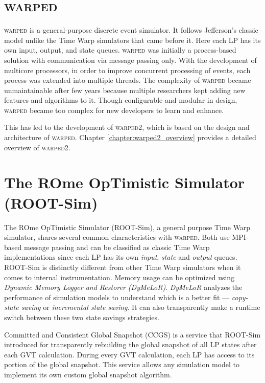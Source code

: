 \documentclass[11pt]{book}
\begin{document}
\section{\textsc{warped}}

\textsc{warped} \cite{martin-96,ramanan-98-iscope} is a general-purpose discrete event simulator.  It follows
Jefferson's classic model unlike the Time Warp simulators that came before it.  Here each LP has its own
input, output, and state queues.  \textsc{warped} was initially a process-based solution with communication
via message passing only.  With the development of multicore processors, in order to improve concurrent
processing of events, each process was extended into multiple threads.  The complexity of \textsc{warped}
became unmaintainable after few years because multiple researchers kept adding new features and algorithms to
it.  Though configurable and modular in design, \textsc{warped} became too complex for new developers to learn
and enhance.

This has led to the development of \textsc{warped2}, which is based on the design and architecture 
of \textsc{warped}. Chapter \ref{chapter:warped2_overview} provides a detailed overview of
\textsc{warped2}.

\section[\textsc{root-sim}]{The ROme OpTimistic Simulator (ROOT-Sim)}

The ROme OpTimistic Simulator \cite{pellegrini-11} (ROOT-Sim), a general purpose Time Warp simulator,
shares several common characteristics with \textsc{warped}.  Both use MPI-based message passing and can be
classified as classic Time Warp implementations since each LP has its own \emph{input}, \emph{state} and
\emph{output} queues.  ROOT-Sim is distinctly different from other Time Warp simulators when it comes to
internal instrumentation.  Memory usage can be optimized using \emph{Dynamic Memory Logger and Restorer
  (DyMeLoR)}.  \emph{DyMeLoR} analyzes the performance of simulation models to understand which is a better
fit --- \emph{copy-state saving} or \emph{incremental state saving}.  It can also transparently make a runtime
switch between these two state savings strategies.

Committed and Consistent Global Snapshot (CCGS) is a service that ROOT-Sim introduced for transparently
rebuilding the global snapshot of all LP states after each GVT calculation.  During every GVT calculation,
each LP has access to its portion of the global snapshot.  This service allows any simulation model to
implement its own custom global snapshot algorithm.
\end{document}
